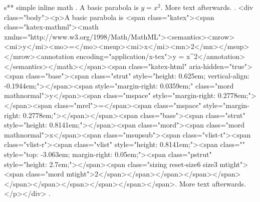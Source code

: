 s** simple inline math
.
A basic parabola is $y = x^2$. More text afterwards.
.
<div class="body"><p>A basic parabola is <span class="katex"><span class="katex-mathml"><math xmlns="http://www.w3.org/1998/Math/MathML"><semantics><mrow><mi>y</mi><mo>=</mo><msup><mi>x</mi><mn>2</mn></msup></mrow><annotation encoding="application/x-tex">y = x^2</annotation></semantics></math></span><span class="katex-html" aria-hidden="true"><span class="base"><span class="strut" style="height: 0.625em; vertical-align: -0.1944em;"></span><span style="margin-right: 0.0359em;" class="mord mathnormal">y</span><span class="mspace" style="margin-right: 0.2778em;"></span><span class="mrel">=</span><span class="mspace" style="margin-right: 0.2778em;"></span></span><span class="base"><span class="strut" style="height: 0.8141em;"></span><span class="mord"><span class="mord mathnormal">x</span><span class="msupsub"><span class="vlist-t"><span class="vlist-r"><span class="vlist" style="height: 0.8141em;"><span class="" style="top: -3.063em; margin-right: 0.05em;"><span class="pstrut" style="height: 2.7em;"></span><span class="sizing reset-size6 size3 mtight"><span class="mord mtight">2</span></span></span></span></span></span></span></span></span></span></span>. More text afterwards.</p></div>
.

